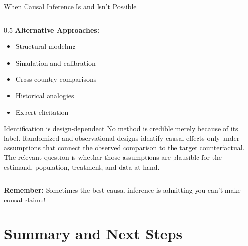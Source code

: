 \documentclass[aspectratio=169,11pt]{beamer}
\begin{document}
\begin{frame}{When Causal Inference Is and Isn't Possible}
\begin{columns}
\begin{column}{0.5\textwidth}
\vspace{0.3cm}
\textbf{Alternative Approaches:}
\begin{itemize}
\item Structural modeling
\item Simulation and calibration
\item Cross-country comparisons
\item Historical analogies
\item Expert elicitation
\end{itemize}

\vspace{0.3cm}
\begin{block}{Identification is design-dependent}
No method is credible merely because of its label. Randomized and observational designs identify causal effects only under assumptions that connect the observed comparison to the target counterfactual. The relevant question is whether those assumptions are plausible for the estimand, population, treatment, and data at hand.
\end{block}
\end{column}
\end{columns}

\textbf{Remember:} Sometimes the best causal inference is admitting you can't make causal claims!
\end{frame}

\section{Summary and Next Steps}
\end{document}
